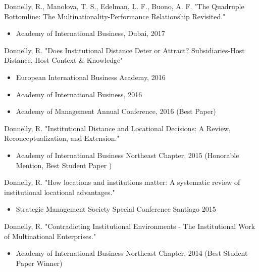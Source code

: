 \documentclass[margin, 12pt]{res}
\begin{document}
\begin{resume}
\vspace{-0.25cm}

Donnelly, R., Manolova, T. S., Edelman, L. F., Buono, A. F. "The Quadruple Bottomline: The Multinationality-Performance Relationship Revisited." 
\begin{itemize}
\item Academy of International Business, Dubai, 2017
\end{itemize}

\vspace{-0.25cm}
Donnelly, R. "Does Institutional Distance Deter or Attract? Subsidiaries-Host Distance, Host Context \& Knowledge" 
\begin{itemize}
\item European International Business Academy, 2016
\item Academy of International Business, 2016
\item Academy of Management Annual Conference, 2016 (Best Paper)
\end{itemize}
\vspace{-0.25cm}
Donnelly, R. "Institutional Distance and Locational Decisions: A Review, Reconceptualization, and Extension." 


\begin{itemize}
\item Academy of International Business Northeast Chapter, 2015 (Honorable Mention, Best Student Paper )
\end{itemize}



\vspace{-0.25cm}
Donnelly, R.  "How locations and institutions matter: A systematic review of institutional locational advantages." 
\begin{itemize}
\item Strategic Management Society Special Conference Santiago 2015
\end{itemize}
\vspace{-0.25cm}
Donnelly, R.  "Contradicting Institutional Environments - The Institutional Work of Multinational Enterprises."
\begin{itemize}
\item Academy of International Business Northeast Chapter, 2014  (Best Student Paper Winner)


\end{itemize}
\end{resume}
\end{document}
